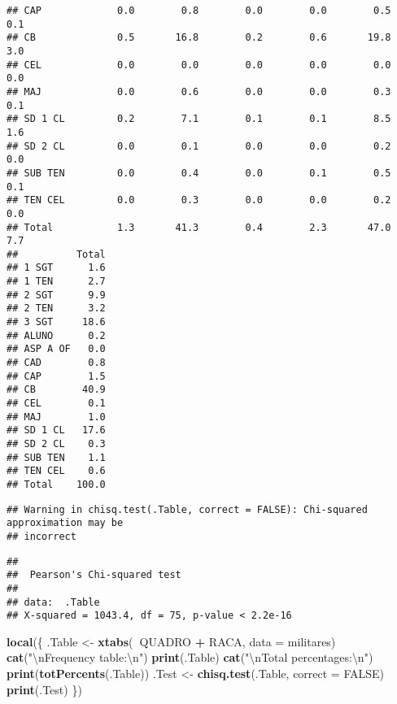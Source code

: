 \documentclass[
]{article}
\newenvironment{Shaded}{\begin{snugshade}}{\end{snugshade}}
\newcommand{\CharTok}[1]{\textcolor[rgb]{0.31,0.60,0.02}{#1}}
\newcommand{\DataTypeTok}[1]{\textcolor[rgb]{0.13,0.29,0.53}{#1}}
\newcommand{\KeywordTok}[1]{\textcolor[rgb]{0.13,0.29,0.53}{\textbf{#1}}}
\newcommand{\NormalTok}[1]{#1}
\newcommand{\OperatorTok}[1]{\textcolor[rgb]{0.81,0.36,0.00}{\textbf{#1}}}
\newcommand{\OtherTok}[1]{\textcolor[rgb]{0.56,0.35,0.01}{#1}}
\newcommand{\StringTok}[1]{\textcolor[rgb]{0.31,0.60,0.02}{#1}}
\begin{document}
\begin{verbatim}
## CAP             0.0        0.8        0.0        0.0        0.5        0.1
## CB              0.5       16.8        0.2        0.6       19.8        3.0
## CEL             0.0        0.0        0.0        0.0        0.0        0.0
## MAJ             0.0        0.6        0.0        0.0        0.3        0.1
## SD 1 CL         0.2        7.1        0.1        0.1        8.5        1.6
## SD 2 CL         0.0        0.1        0.0        0.0        0.2        0.0
## SUB TEN         0.0        0.4        0.0        0.1        0.5        0.1
## TEN CEL         0.0        0.3        0.0        0.0        0.2        0.0
## Total           1.3       41.3        0.4        2.3       47.0        7.7
##          Total
## 1 SGT      1.6
## 1 TEN      2.7
## 2 SGT      9.9
## 2 TEN      3.2
## 3 SGT     18.6
## ALUNO      0.2
## ASP A OF   0.0
## CAD        0.8
## CAP        1.5
## CB        40.9
## CEL        0.1
## MAJ        1.0
## SD 1 CL   17.6
## SD 2 CL    0.3
## SUB TEN    1.1
## TEN CEL    0.6
## Total    100.0
\end{verbatim}

\begin{verbatim}
## Warning in chisq.test(.Table, correct = FALSE): Chi-squared approximation may be
## incorrect
\end{verbatim}

\begin{verbatim}
## 
##  Pearson's Chi-squared test
## 
## data:  .Table
## X-squared = 1043.4, df = 75, p-value < 2.2e-16
\end{verbatim}

\begin{Shaded}
\begin{Highlighting}[]
\KeywordTok{local}\NormalTok{(\{}
\NormalTok{    .Table <-}\StringTok{ }\KeywordTok{xtabs}\NormalTok{(}\OperatorTok{~}\NormalTok{QUADRO }\OperatorTok{+}\StringTok{ }\NormalTok{RACA, }\DataTypeTok{data =}\NormalTok{ militares)}
    \KeywordTok{cat}\NormalTok{(}\StringTok{"}\CharTok{\textbackslash{}n}\StringTok{Frequency table:}\CharTok{\textbackslash{}n}\StringTok{"}\NormalTok{)}
    \KeywordTok{print}\NormalTok{(.Table)}
    \KeywordTok{cat}\NormalTok{(}\StringTok{"}\CharTok{\textbackslash{}n}\StringTok{Total percentages:}\CharTok{\textbackslash{}n}\StringTok{"}\NormalTok{)}
    \KeywordTok{print}\NormalTok{(}\KeywordTok{totPercents}\NormalTok{(.Table))}
\NormalTok{    .Test <-}\StringTok{ }\KeywordTok{chisq.test}\NormalTok{(.Table, }\DataTypeTok{correct =} \OtherTok{FALSE}\NormalTok{)}
    \KeywordTok{print}\NormalTok{(.Test)}
\NormalTok{\})}
\end{Highlighting}
\end{Shaded}
\end{document}
